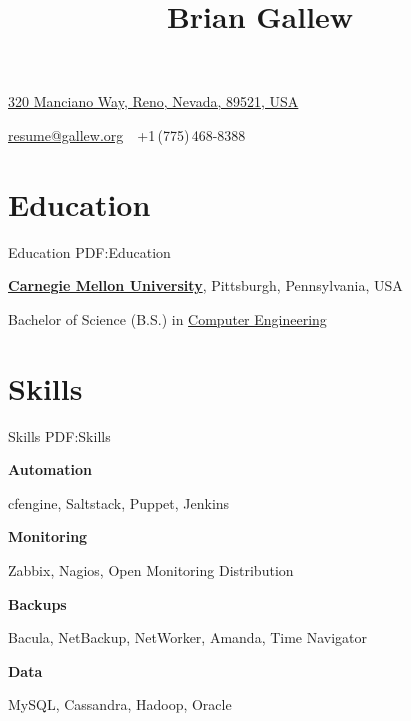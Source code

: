 \documentclass[letterpaper,10pt,oneside]{article}
\begin{document}

\title{Brian Gallew}

\begin{subtitle}
\href{https://www.google.com/maps/place/320+Manciano+Way,+Reno,+NV+89521,+USA}
{320 Manciano Way, Reno, Nevada, 89521, USA}
\par
\href{mailto:resume@gallew.org}
{resume@gallew.org}
\,\BulletSymbol\,
+1\,(775)\,468-8388
\end{subtitle}

\begin{body}





\section
{Education}
{Education}
{PDF:Education}

\href{http://www.cmu.edu/}
{\textbf{Carnegie Mellon University}},
Pittsburgh, Pennsylvania, USA
\par
Bachelor of Science (B.S.) in
\href{http://www.ece.cmu.edu/}
{Computer Engineering}
\hfill


\section
{Skills}
{Skills}
{PDF:Skills}

\textbf{Automation}\par
cfengine, Saltstack, Puppet, Jenkins
\SmallEntryGap

\textbf{Monitoring}\par
Zabbix, Nagios, Open Monitoring Distribution
\SmallEntryGap

\textbf{Backups}\par
Bacula, NetBackup, NetWorker, Amanda, Time Navigator
\SmallEntryGap

\textbf{Data}\par
MySQL, Cassandra, Hadoop, Oracle
\SmallEntryGap


\end{body}
\end{document}
